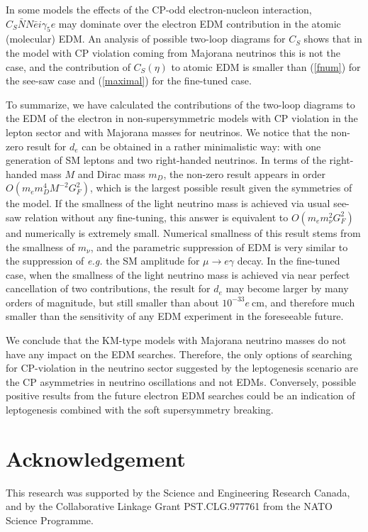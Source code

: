 In some models the effects of the CP-odd electron-nucleon
interaction, $C_S \bar NN \bar e i \gamma_5e$ may dominate over
the electron EDM contribution \cite{Cs} in the atomic (molecular)
EDM. An analysis of possible two-loop diagrams for $C_S$ shows
that in the model with CP violation coming from Majorana neutrinos
this is not the case, and the contribution of $C_S(\eta)$ to
atomic EDM is smaller than (\ref{fnum}) for the see-saw case and
(\ref{maximal}) for the fine-tuned case.

To summarize, we have calculated the contributions of the two-loop
diagrams to the EDM of the electron in non-supersymmetric models
with CP violation in the lepton sector and with Majorana masses
for neutrinos. We notice that the non-zero result for $d_e$ can be
obtained in a rather minimalistic way: with one generation of SM
leptons and two right-handed neutrinos. In terms of the
right-handed mass $M$ and Dirac mass $m_D$, the non-zero result
appears in order $O(m_em_D^4M^{-2}G_F^2)$, which is the largest
possible result given the symmetries of the model. If the
smallness of the light neutrino mass is achieved via usual see-saw
relation without any fine-tuning, this answer is equivalent to
$O(m_em_\nu^2G_F^2)$ and numerically is extremely small. Numerical
smallness of this result stems from the smallness of $m_\nu$, and
the parametric suppression of EDM is very similar to the
suppression of {\em e.g.} the SM amplitude for $\mu\to e\gamma$
decay. In the fine-tuned case, when the smallness of the light
neutrino mass is achieved via near perfect cancellation of two
contributions, the result for $d_e$ may become larger by many
orders of magnitude, but still smaller than about $10^{-33}e~$cm,
and therefore much smaller than the sensitivity of any EDM
experiment in the foreseeable future.

We conclude that the KM-type models with Majorana neutrino masses
do not have any impact on the EDM searches. Therefore, the only
options of searching for CP-violation in the neutrino sector
suggested by the leptogenesis scenario are the CP asymmetries in
neutrino oscillations and not EDMs. Conversely, possible positive
results from the future electron EDM searches could be an
indication of leptogenesis combined with the soft supersymmetry
breaking.

\section*{Acknowledgement}
This research was supported by the Science and Engineering
Research Canada, and by the Collaborative Linkage Grant
PST.CLG.977761 from the NATO Science Programme.

